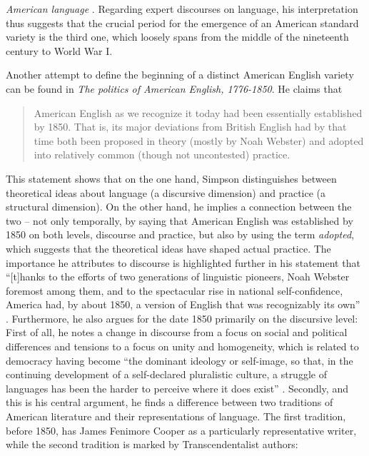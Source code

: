 \textit{American language} \citep[xii]{Davis2003}. Regarding expert discourses on language, his interpretation thus suggests that the crucial period for the emergence of an American standard variety is the third one, which loosely spans from the middle of the nineteenth century to World War I.

Another attempt to define the beginning of a distinct American English variety can be found in  \emph{The politics of American English, 1776-1850}. He claims that

\begin{quote}
American English as we recognize it today had been essentially established by 1850. That is, its major deviations from British English had by that time both been proposed in theory (mostly by Noah Webster) and adopted into relatively common (though not uncontested) practice. \citep[11]{Simpson1986}
\end{quote}


This statement shows that on the one hand, Simpson distinguishes between theoretical ideas about language (a discursive dimension) and practice (a structural dimension). On the other hand, he implies a connection between the two – not only temporally, by saying that American English was established by 1850 on both levels, discourse and practice, but also by using the term \textit{adopted}, which suggests that the theoretical ideas have shaped actual practice. The importance he attributes to discourse is highlighted further in his statement that “[t]hanks to the efforts of two generations of linguistic pioneers, Noah Webster foremost among them, and to the spectacular rise in national self-confidence, America had, by about 1850, a version of English that was recognizably its own” \citep[3]{Simpson1986}. Furthermore, he also argues for the date 1850 primarily on the discursive level: First of all, he notes a change in discourse from a focus on social and political differences and tensions to a focus on unity and homogeneity, which is related to democracy having become “the dominant ideology or self-image, so that, in the continuing development of a self-declared pluralistic culture, a struggle of languages has been the harder to perceive where it does exist” \citep[7]{Simpson1986}. Secondly, and this is his central argument, he finds a difference between two traditions of American literature and their representations of language. The first tradition, before 1850, has James Fenimore Cooper as a particularly representative writer, while the second tradition is marked by Transcendentalist authors:


